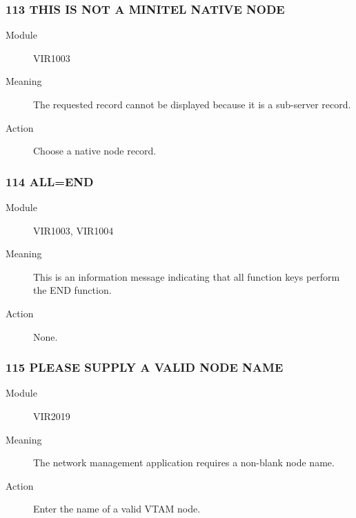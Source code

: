 \documentclass[letterpaper,10pt,english]{sphinxmanual}
\begin{document}
\subsubsection{113 THIS IS NOT A MINITEL NATIVE NODE}
\label{\detokenize{messages:this-is-not-a-minitel-native-node}}\begin{description}
\item[{Module}] \leavevmode
VIR1003

\item[{Meaning}] \leavevmode
The requested record cannot be displayed because it is a sub-server record.

\item[{Action}] \leavevmode
Choose a native node record.

\end{description}


\subsubsection{114 ALL=END}
\label{\detokenize{messages:all-end}}\begin{description}
\item[{Module}] \leavevmode
VIR1003, VIR1004

\item[{Meaning}] \leavevmode
This is an information message indicating that all function keys perform the END function.

\item[{Action}] \leavevmode
None.

\end{description}


\subsubsection{115 PLEASE SUPPLY A VALID NODE NAME}
\label{\detokenize{messages:please-supply-a-valid-node-name}}\begin{description}
\item[{Module}] \leavevmode
VIR2019

\item[{Meaning}] \leavevmode
The network management application requires a non-blank node name.

\item[{Action}] \leavevmode
Enter the name of a valid VTAM node.

\end{description}
\end{document}
